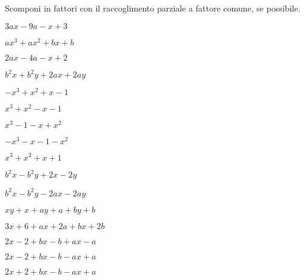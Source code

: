\begin{esercizio}
\label{ese:div.014}
Scomponi in fattori con il raccoglimento parziale a fattore comune, se possibile.
\begin{multicols}{2}
\begin{enumeratea}
 \item $3ax-9a-x+3$
 \item $ax^{3}+ax^{2}+bx+b$
 \item $2ax-4a-x+2$
 \item $b^{2}x+b^{2}y+2ax+2ay$
 \item $-x^{3}+x^{2}+x-1$
 \item $x^{3}+x^{2}-x-1$
 \item $x^{3}-1-x+x^{2}$
 \item $-x^{3}-x-1-x^{2}$
 \item $x^{3}+x^{2}+x+1$
 \item $b^{2}x-b^{2}y+2x-2y$
 \item $b^{2}x-b^{2}y-2ax-2ay$
 \item $xy+x+ay+a+by+b$
 \item $3x+6+ax+2a+bx+2b$
 \item $2x-2+bx-b+ax-a$
 \item $2x-2+bx-b-ax+a$
 \item $2x+2+bx-b-ax+a$
\end{enumeratea}
\end{multicols}
\end{esercizio}
% 

